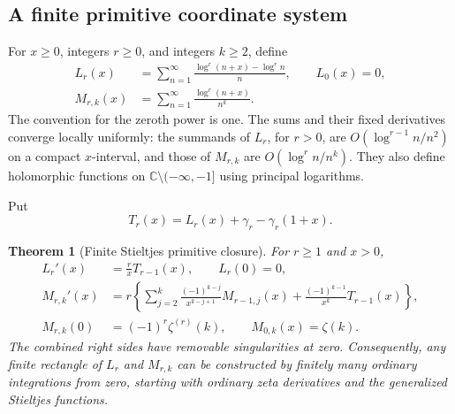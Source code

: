 \documentclass[11pt,letterpaper]{article}
\numberwithin{equation}{section}
\theoremstyle{plain}
\newtheorem{theorem}{Theorem}[section]
\theoremstyle{definition}
\theoremstyle{remark}
\begin{document}
\subsection{A finite primitive coordinate system}

For $x\ge0$, integers $r\ge0$, and integers $k\ge2$, define
\begin{align}
 L_r(x)&=\sum_{n=1}^{\infty}
   \frac{\log^r(n+x)-\log^r n}{n},\qquad L_0(x)=0,
       \label{mz:L}\\
 M_{r,k}(x)&=\sum_{n=1}^{\infty}
          \frac{\log^r(n+x)}{n^k}.
       \label{mz:M}
\end{align}
The convention for the zeroth power is one. The sums and their fixed
derivatives converge locally uniformly: the summands of $L_r$, for $r>0$,
are $O(\log^{r-1}n/n^2)$ on a compact $x$-interval, and those of $M_{r,k}$
are $O(\log^r n/n^k)$. They also define holomorphic functions on
$\mathbb C\setminus(-\infty,-1]$ using principal logarithms.

Put
\begin{equation}
 T_r(x)=L_r(x)+\gamma_r-\gamma_r(1+x).
 \label{mz:T}
\end{equation}

\begin{theorem}[Finite Stieltjes primitive closure]
\label{mz:thm:primitive}
For $r\ge1$ and $x>0$,
\begin{align}
 L_r'(x)&=\frac r{x}T_{r-1}(x),\qquad L_r(0)=0,
      \label{mz:Lrec}\\
 M_{r,k}'(x)
 &=r\left\{\sum_{j=2}^{k}
     \frac{(-1)^{k-j}}{x^{k-j+1}}M_{r-1,j}(x)
       +\frac{(-1)^{k-1}}{x^k}T_{r-1}(x)\right\},
      \label{mz:Mrec}\\
 M_{r,k}(0)&=(-1)^r\zeta^{(r)}(k),
       \qquad M_{0,k}(x)=\zeta(k).
      \label{mz:Minitial}
\end{align}
The combined right sides have removable singularities at zero.
Consequently, any finite rectangle of $L_r$ and $M_{r,k}$ can be
constructed by finitely many ordinary integrations from zero, starting
with ordinary zeta derivatives and the generalized Stieltjes functions.
\end{theorem}
\end{document}
